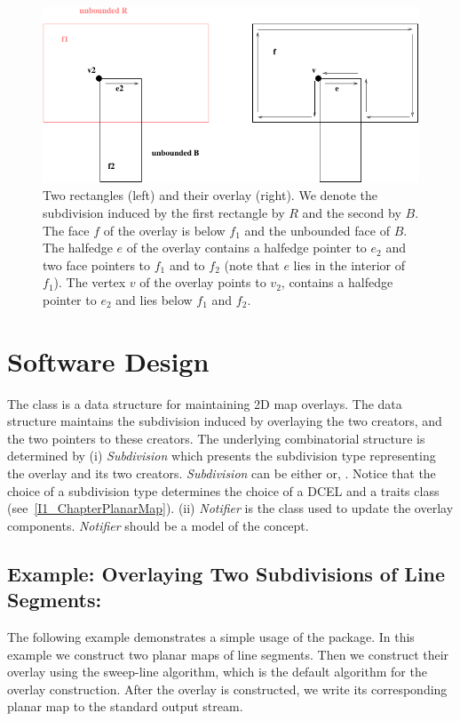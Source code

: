 \begin{figure}[h]
  \begin{ccTexOnly}
    \centerline{\includegraphics{Map_overlay_2/overlay_example}}
  \end{ccTexOnly}
  \caption{Two rectangles (left) and their overlay (right). 
    We denote the subdivision induced by the first rectangle by $R$
    and the second by $B$. The face $f$ of the overlay is below $f_1$
    and the unbounded face of $B$. The halfedge $e$ of the overlay
    contains a halfedge pointer to $e_2$ and two face pointers to
    $f_1$ and to $f_2$ (note that $e$ lies in the interior of
    $f_1$). The vertex $v$ of the overlay points to $v_2$, contains a
    halfedge pointer to $e_2$ and lies below $f_1$ and $f_2$.}
  \label{fig:overlay_example}
\end{figure}


\section{Software Design}
The  class 
is a data structure for maintaining 2D map overlays.
The data structure maintains the subdivision induced by overlaying 
the two creators, and the two pointers to these creators. 
The underlying combinatorial structure is determined by
(i) {\it Subdivision} which presents the subdivision type 
representing the overlay and its two creators. 
{\it Subdivision} can be either  or, 
 .
Notice that the choice of a subdivision type determines the choice 
of a DCEL and a traits class (see~\ref{I1_ChapterPlanarMap}).
(ii) {\it Notifier} is the class used to update the overlay components. 
{\it Notifier} should be a model of the 
 concept.

\subsection*{Example: Overlaying Two Subdivisions of Line Segments:}
The following example demonstrates a simple usage of the 
 package.
In this example we construct two planar maps of line segments. 
Then we construct their overlay using the sweep-line algorithm, which is 
the default algorithm for the overlay construction. 
After the overlay is constructed, we write its corresponding planar map to the 
standard output stream. 

